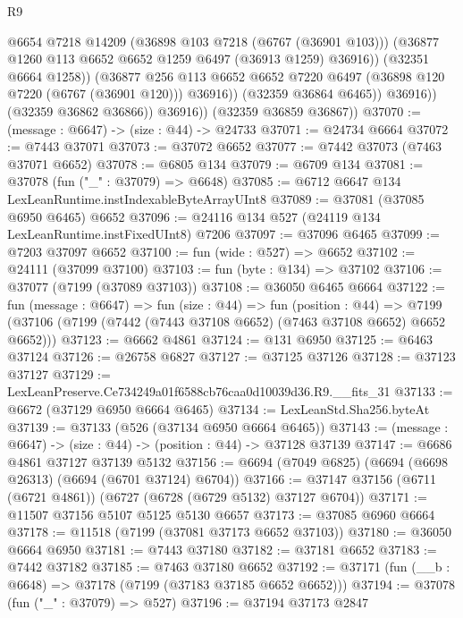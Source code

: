 \begin{lexlean}{R9}
\begin{coremodule}
                        @6654
                        @7218
                        @14209
                        (@36898 @103 @7218 (@6767 (@36901 @103)))
                        (@36877 @1260 @113 @6652 @6652 @1259 @6497 (@36913 @1259) @36916))
                      (@32351 @6664 @1258))
                    (@36877
                      @256
                      @113
                      @6652
                      @6652
                      @7220
                      @6497
                      (@36898 @120 @7220 (@6767 (@36901 @120)))
                      @36916))
                  (@32359 @36864 @6465))
                @36916))
            (@32359 @36862 @36866))
          @36916))
      (@32359 @36859 @36867))
@37070 := (message : @6647) -> (size : @44) -> @24733
@37071 := @24734 @6664
@37072 := @7443 @37071
@37073 := @37072 @6652
@37077 := @7442 @37073 (@7463 @37071 @6652)
@37078 := @6805 @134
@37079 := @6709 @134
@37081 := @37078 (fun ("_" : @37079) => @6648)
@37085 := @6712 @6647 @134 LexLeanRuntime.instIndexableByteArrayUInt8
@37089 := @37081 (@37085 @6950 @6465) @6652
@37096 := @24116 @134 @527 (@24119 @134 LexLeanRuntime.instFixedUInt8) @7206
@37097 := @37096 @6465
@37099 := @7203 @37097 @6652
@37100 := fun (wide : @527) => @6652
@37102 := @24111 (@37099 @37100)
@37103 := fun (byte : @134) => @37102
@37106 := @37077 (@7199 (@37089 @37103))
@37108 := @36050 @6465 @6664
@37122 := fun (message : @6647) =>
  fun (size : @44) =>
  fun (position : @44) =>
  @7199 (@37106 (@7199 (@7442 (@7443 @37108 @6652) (@7463 @37108 @6652) @6652 @6652)))
@37123 := @6662 @4861
@37124 := @131 @6950
@37125 := @6463 @37124
@37126 := @26758 @6827
@37127 := @37125 @37126
@37128 := @37123 @37127
@37129 := LexLeanPreserve.Ce734249a01f6588cb76caa0d10039d36.R9.__fits_31
@37133 := @6672 (@37129 @6950 @6664 @6465)
@37134 := LexLeanStd.Sha256.byteAt
@37139 := @37133 (@526 (@37134 @6950 @6664 @6465))
@37143 := (message : @6647) -> (size : @44) -> (position : @44) -> @37128 @37139
@37147 := @6686 @4861 @37127 @37139 @5132
@37156 := @6694 (@7049 @6825) (@6694 (@6698 @26313) (@6694 (@6701 @37124) @6704))
@37166 := @37147 @37156 (@6711 (@6721 @4861)) (@6727 (@6728 (@6729 @5132) @37127 @6704))
@37171 := @11507 @37156 @5107 @5125 @5130 @6657
@37173 := @37085 @6960 @6664
@37178 := @11518 (@7199 (@37081 @37173 @6652 @37103))
@37180 := @36050 @6664 @6950
@37181 := @7443 @37180
@37182 := @37181 @6652
@37183 := @7442 @37182
@37185 := @7463 @37180 @6652
@37192 := @37171 (fun (__b : @6648) => @37178 (@7199 (@37183 @37185 @6652 @6652)))
@37194 := @37078 (fun ("_" : @37079) => @527)
@37196 := @37194 @37173 @2847

\end{coremodule}
\end{lexlean}
